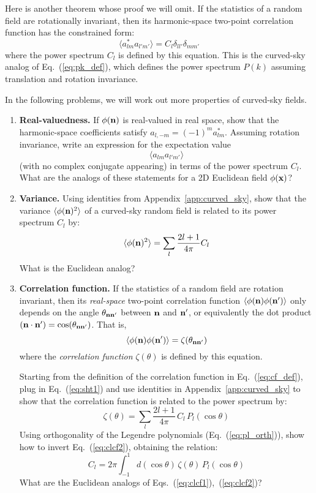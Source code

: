 \documentclass[aps,prd,superscriptaddress,groupedaddress,nofootinbib,nobibnotes]{revtex4}
\newcommand{\be}{\begin{equation}}
\newcommand{\ee}{\end{equation}}
\def\x{{\bf x}}
\def\n{{\bf n}}
\begin{document}
Here is another theorem whose proof we will omit.
If the statistics of a random field are rotationally invariant, then its harmonic-space two-point
correlation function has the constrained form:
\be
\langle a_{l m}^* a_{l'm'} \rangle = C_l \delta_{ll'} \delta_{mm'}   \label{eq:cl_def}
\ee
where the power spectrum $C_l$ is defined by this equation.  This is the curved-sky analog of
Eq.~(\ref{eq:pk_def}), which defines the power spectrum $P(k)$ assuming translation and rotation
invariance.

In the following problems, we will work out more properties of curved-sky fields.

\begin{enumerate}

\item {\bf Real-valuedness.} If $\phi(\n)$ is real-valued in real space, show that the harmonic-space 
 coefficients satisfy $a_{l,-m} = (-1)^m a_{lm}^*$.  Assuming rotation invariance, write an expression 
 for the expectation value
\be
\langle a_{lm} a_{l'm'} \rangle
\ee
 (with no complex conjugate appearing) in terms of the power spectrum $C_l$.  
 What are the analogs of these statements for a 2D Euclidean field $\phi(\x)$?

\item {\bf Variance.} Using identities from Appendix~\ref{app:curved_sky}, show that the variance 
 $\langle \phi(\n)^2 \rangle$ of a curved-sky random field is related to its power spectrum $C_l$ by:
\be
\langle \phi(\n)^2 \rangle = \sum_l \frac{2l+1}{4\pi} C_l
\ee
 What is the Euclidean analog?

\item {\bf Correlation function.} If the statistics of a random field are rotation invariant, then its {\em real-space}
 two-point correlation function $\langle \phi(\n) \phi(\n') \rangle$ only depends on the angle
 $\theta_{\n\n'}$ between $\n$ and $\n'$, or equivalently the dot product $(\n\cdot\n') = \cos(\theta_{\n\n'})$.  
 That is,
\be
 \langle \phi(\n) \phi(\n') \rangle = \zeta(\theta_{\n\n'})  \label{eq:cf_def}
\ee
 where the {\em correlation function} $\zeta(\theta)$ is defined by this equation.

 Starting from the definition of the correlation function in Eq.~(\ref{eq:cf_def}),
 plug in Eq.~(\ref{eq:sht1}) and use identities in Appendix~\ref{app:curved_sky}
 to show that the correlation function is related to the power spectrum by:
\be
 \zeta(\theta) = \sum_l \frac{2l+1}{4\pi} \, C_l \, P_l(\cos\theta)  \label{eq:clcf1}
\ee
 Using orthogonality of the Legendre polynomials (Eq.~(\ref{eq:pl_orth})), show how
 to invert Eq.~(\ref{eq:clcf2}), obtaining the relation:
\be
C_l = 2\pi \int_{-1}^1 d(\cos\theta) \, \zeta(\theta) \, P_l(\cos\theta)  \label{eq:clcf2}
\ee
 What are the Euclidean analogs of Eqs.~(\ref{eq:clcf1}),~(\ref{eq:clcf2})?


\end{enumerate}
\end{document}
